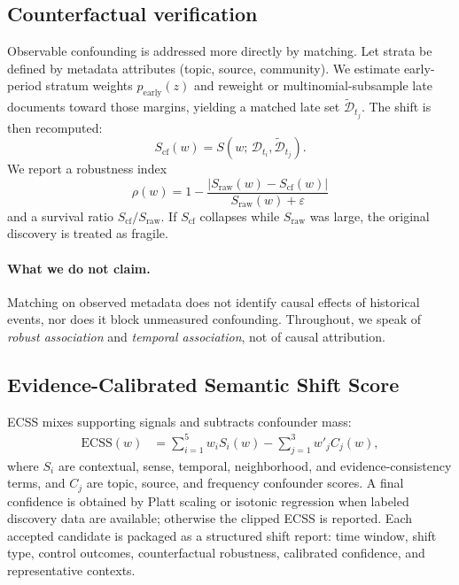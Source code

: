 \documentclass{llncs}
\begin{document}
\subsection{Counterfactual verification}
Observable confounding is addressed more directly by matching.
Let strata be defined by metadata attributes (topic, source, community).
We estimate early-period stratum weights $p_{\mathrm{early}}(z)$ and reweight or multinomial-subsample late documents toward those margins, yielding a matched late set $\tilde{\mathcal{D}}_{t_j}$.
The shift is then recomputed:
\begin{equation}
S_{\mathrm{cf}}(w)=S\!\left(w;\,\mathcal{D}_{t_i},\tilde{\mathcal{D}}_{t_j}\right).
\end{equation}
We report a robustness index
\begin{equation}
\rho(w)=1-\frac{\lvert S_{\mathrm{raw}}(w)-S_{\mathrm{cf}}(w)\rvert}{S_{\mathrm{raw}}(w)+\varepsilon}
\end{equation}
and a survival ratio $S_{\mathrm{cf}}/S_{\mathrm{raw}}$.
If $S_{\mathrm{cf}}$ collapses while $S_{\mathrm{raw}}$ was large, the original discovery is treated as fragile.

\paragraph{What we do not claim.}
Matching on observed metadata does not identify causal effects of historical events, nor does it block unmeasured confounding.
Throughout, we speak of \emph{robust association} and \emph{temporal association}, not of causal attribution.

\subsection{Evidence-Calibrated Semantic Shift Score}
ECSS mixes supporting signals and subtracts confounder mass:
\begin{equation}
\begin{aligned}
\mathrm{ECSS}(w)
&=
\sum_{i=1}^{5} w_i S_i(w)
-
\sum_{j=1}^{3} w'_j C_j(w),
\end{aligned}
\end{equation}
where $S_i$ are contextual, sense, temporal, neighborhood, and evidence-consistency terms, and $C_j$ are topic, source, and frequency confounder scores.
A final confidence is obtained by Platt scaling or isotonic regression when labeled discovery data are available; otherwise the clipped ECSS is reported.
Each accepted candidate is packaged as a structured shift report: time window, shift type, control outcomes, counterfactual robustness, calibrated confidence, and representative contexts.
\end{document}
